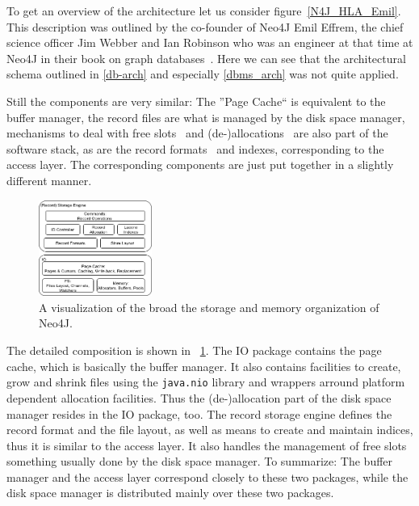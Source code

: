         To get an overview of the architecture let us consider figure~\ref{N4J_HLA_Emil}.
        This description was outlined by the co-founder of Neo4J Emil Effrem, the chief science officer Jim Webber and Ian Robinson who was an engineer at that time at Neo4J in their book on graph databases~\autocite{robinson2015graph}.
        Here we can see that the architectural schema outlined in \ref{db-arch} and especially \ref{dbms_arch} was not quite applied.
        
        Still the components are very similar:
        The ''Page Cache`` is equivalent to the buffer manager, the record files are what is managed by the disk space manager, mechanisms to deal with free slots~\autocite{neo4jidgenerator} and (de-)allocations~\autocite{neo4jio} are also part of the software stack, as are the record formats~\autocite{neo4jrecordstorage} and indexes, corresponding to the access layer. 
        The corresponding components are just put together in a slightly different manner. 
        
        \begin{figure}[htp]
            \begin{center}
                \includegraphics[keepaspectratio,width=0.33\textwidth,height=0.3\textheight]{img/03-preliminaries/N4J_Storage.png}
            \end{center}
            \caption{A visualization of the broad the storage and memory organization of Neo4J.} \label{N4J_Storage}
        \end{figure}
        
        The detailed composition is shown in ~\ref{N4J_Storage}.
        The IO package contains the page cache, which is basically the buffer manager.
        It also contains facilities to create, grow and shrink files using the \texttt{java.nio} library and wrappers arround platform dependent allocation facilities.
        Thus the (de-)allocation part of the disk space manager resides in the IO package, too.
        The record storage engine defines the record format and the file layout, as well as means to create and maintain indices, thus it is similar to the access layer. 
        It also handles the management of free slots something usually done by the disk space manager.
        To summarize: The buffer manager and the access layer correspond closely to these two packages, while the disk space manager is distributed mainly over these two packages.        


